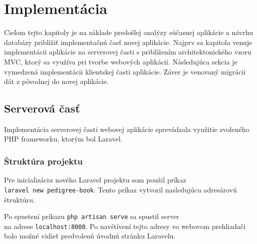 \chapter{Implementácia}
Cieľom tejto kapitoly je na základe predošlej analýzy súčasnej aplikácie a návrhu databázy priblížiť implementačnú časť novej aplikácie. Najprv sa kapitola venuje implementácii aplikácie na serverovej časti s priblížením architektonického vzoru MVC, ktorý sa využíva pri tvorbe webových aplikácií. Následujúca sekcia je vymedzená implementácii klientskej časti aplikácie. Záver je venovaný migrácii dát z pôvodnej do novej aplikácie.

\section{Serverová časť}
Implementácia serverovej časti webovej aplikácie sprevádzala využitie zvoleného PHP frameworku, ktorým bol Laravel.

\subsection{Štruktúra projektu}
Pre inicializáciu nového Laravel projektu som použil príkaz\\ \texttt{laravel new pedigree-book}. Tento príkaz vytvoril nasledujúcu adresárovú štruktúru.

\begin{figure}[H]
\end{figure}

Po spustení príkazu \texttt{php artisan serve} sa spustil server \\ na adrese \texttt{localhost:8000}. Po navštívení tejto adresy vo webovom prehliadači bolo možné vidieť predvolenú úvodnú stránku Laravelu.

